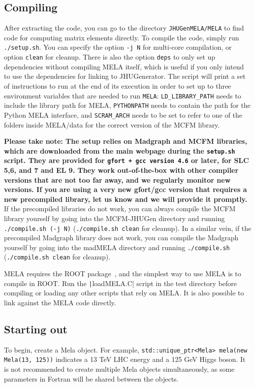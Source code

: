 \documentclass[aps,superscriptaddress,nofootinbib]{revtex4}
\begin{document}
\subsection{Compiling}
After extracting the code, you can go to the directory \texttt{JHUGenMELA/MELA} to find code for computing matrix elements directly.
To compile the code, simply run \texttt{./setup.sh}. You can specify the option \verb|-j N| for multi-core compilation, or option \verb|clean| for cleanup. There is also the option \verb|deps| to only set up dependencies without compiling MELA itself, which is useful if you only intend to use the dependencies for linking to JHUGenerator. The script will print a set of instructions to run at the end of its execution in order to set up to three environment variables that are needed to run \texttt{MELA}: \texttt{LD\_LIBRARY\_PATH} needs to include the library path for MELA, \texttt{PYTHONPATH} needs to contain the path for the Python MELA interface, and \texttt{SCRAM\_ARCH} needs to be set to refer to one of the folders inside MELA/data for the correct version of the MCFM library.

\textbf{Please take note: The setup relies on Madgraph and MCFM libraries, which are downloaded from the main webpage during the \texttt{setup.sh} script.  They are provided for \texttt{gfort + gcc version 4.6} or later, for SLC 5,6, and 7 and EL 9. They work out-of-the-box with other compiler versions that are not too far away, and we regularly monitor new versions. If you are using a very new gfort/gcc version that requires a new precompiled library, let us know and we will provide it promptly.}
If the precompiled libraries do not work, you can always compile the MCFM library yourself by going into the MCFM-JHUGen directory and running \verb|./compile.sh (-j N)| (\verb|./compile.sh clean| for cleanup). 
In a similar vein, if the precompiled Madgraph library does not work, you can compile the Madgraph yourself by going into the madMELA directory and running \verb|./compile.sh| (\verb|./compile.sh clean| for cleanup).

MELA requires the ROOT package~\cite{root}, and the simplest way to use MELA is to compile in ROOT. Run the \texttt|loadMELA.C| script in the test directory before compiling or loading any other scripts that rely on MELA.  It is also possible to link against the MELA code directly.
\subsection{Starting out}
To begin, create a Mela object.  For example, \verb|std::unique_ptr<Mela> mela(new Mela(13, 125))| indicates a 13 TeV LHC energy and a 125 GeV Higgs boson.  It is not recommended to create multiple Mela objects simultaneously, as some parameters in Fortran will be shared between the objects.
\end{document}
